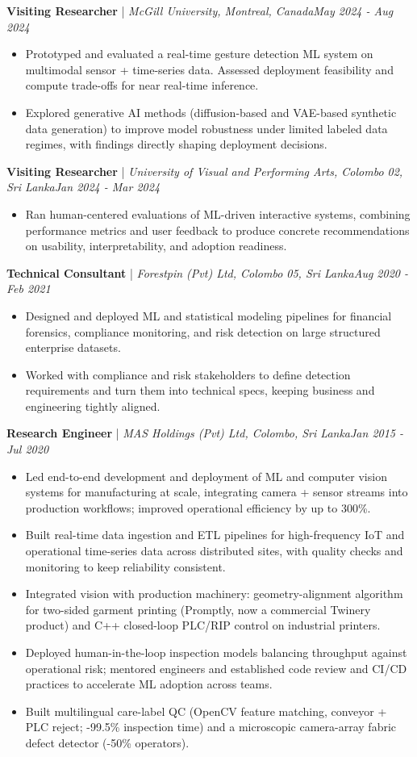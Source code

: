 \documentclass[11pt]{article}
\newenvironment{cvrole}[5]{%
  \par\noindent\textbf{\large #1} | \textit{\small #2, #3}\hfill \textit{\small #4 - #5}\par
  \begin{itemize}[leftmargin=2em, itemsep=-0.3em, topsep=-0.5em]%
}{%
  \end{itemize}\par\noindent\mbox{}\par\vspace{0.1em}%
}
\begin{document}
\newpage
\begin{cvrole}{Visiting Researcher}{McGill University}{Montreal, Canada}{May 2024}{Aug 2024}
    \item Prototyped and evaluated a real-time gesture detection ML system on multimodal sensor + time-series data. Assessed deployment feasibility and compute trade-offs for near real-time inference.
    \item Explored generative AI methods (diffusion-based and VAE-based synthetic data generation) to improve model robustness under limited labeled data regimes, with findings directly shaping deployment decisions.
\end{cvrole}

\begin{cvrole}{Visiting Researcher}{University of Visual and Performing Arts}{Colombo 02, Sri Lanka}{Jan 2024}{Mar 2024}
    \item Ran human-centered evaluations of ML-driven interactive systems, combining performance metrics and user feedback to produce concrete recommendations on usability, interpretability, and adoption readiness.
\end{cvrole}

\begin{cvrole}{Technical Consultant}{Forestpin (Pvt) Ltd}{Colombo 05, Sri Lanka}{Aug 2020}{Feb 2021}
    \item Designed and deployed ML and statistical modeling pipelines for financial forensics, compliance monitoring, and risk detection on large structured enterprise datasets.
    \item Worked with compliance and risk stakeholders to define detection requirements and turn them into technical specs, keeping business and engineering tightly aligned.
\end{cvrole}

\begin{cvrole}{Research Engineer}{MAS Holdings (Pvt) Ltd}{Colombo, Sri Lanka}{Jan 2015}{Jul 2020}
    \item Led end-to-end development and deployment of ML and computer vision systems for manufacturing at scale, integrating camera + sensor streams into production workflows; improved operational efficiency by up to 300\%.
    \item Built real-time data ingestion and ETL pipelines for high-frequency IoT and operational time-series data across distributed sites, with quality checks and monitoring to keep reliability consistent.
    \item Integrated vision with production machinery: geometry-alignment algorithm for two-sided garment printing (Promptly, now a commercial Twinery product) and C++ closed-loop PLC/RIP control on industrial printers.
    \item Deployed human-in-the-loop inspection models balancing throughput against operational risk; mentored engineers and established code review and CI/CD practices to accelerate ML adoption across teams.
    \item Built multilingual care-label QC (OpenCV feature matching, conveyor + PLC reject; -99.5\% inspection time) and a microscopic camera-array fabric defect detector (-50\% operators).
\end{cvrole}
\end{document}
